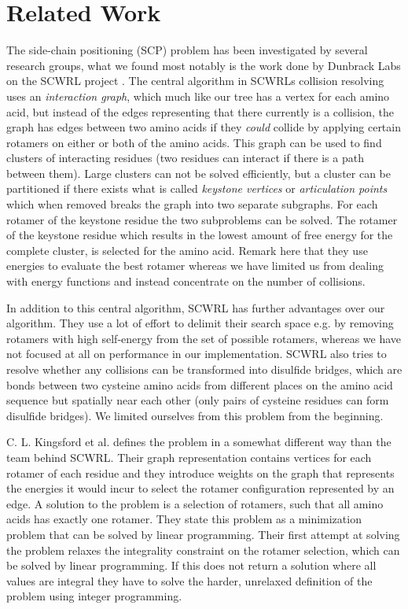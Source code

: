 
\section{Related Work}
The side-chain positioning (SCP) problem has been investigated by
several research groups, what we found most notably is the work done
by Dunbrack Labs on the SCWRL project \cite{canutescu2003graph,
  krivov2009improved}. The central algorithm in SCWRLs collision
resolving uses an \textit{interaction graph}, which much like our tree
has a vertex for each amino acid, but instead of the edges
representing that there currently is a collision, the graph has edges
between two amino acids if they \textit{could} collide by applying
certain rotamers on either or both of the amino acids. This graph can
be used to find clusters of interacting residues (two residues can
interact if there is a path between them). Large clusters can not be
solved efficiently, but a cluster can be partitioned if there exists
what is called \textit{keystone vertices} or \textit{articulation
  points} which when removed breaks the graph into two separate
subgraphs. For each rotamer of the keystone residue the two
subproblems can be solved. The rotamer of the keystone residue which
results in the lowest amount of free energy for the complete cluster,
is selected for the amino acid. Remark here that they use energies to
evaluate the best rotamer whereas we have limited us from dealing
with energy functions and instead concentrate on the number of
collisions.

In addition to this central algorithm, SCWRL has further advantages
over our algorithm. They use a lot of effort to delimit their search
space e.g. by removing rotamers with high self-energy from the set of
possible rotamers, whereas we have not focused at all on performance
in our implementation. SCWRL also tries to resolve whether any
collisions can be transformed into disulfide bridges, which are bonds
between two cysteine amino acids from different places on the amino
acid sequence but spatially near each other (only pairs of cysteine
residues can form disulfide bridges). We limited ourselves from this
problem from the beginning.

C. L. Kingsford et al. \cite{kingsford2005solving} defines the problem
in a somewhat different way than the team behind SCWRL. Their graph
representation contains vertices for each rotamer of each residue and
they introduce weights on the graph that represents the energies it
would incur to select the rotamer configuration represented by an
edge. A solution to the problem is a selection of rotamers, such that
all amino acids has exactly one rotamer. They state this problem as a minimization
problem that can be solved by linear programming. Their first attempt
at solving the problem relaxes the integrality constraint on the
rotamer selection, which can be solved by linear programming. If this
does not return a solution where all values are integral they have to
solve the harder, unrelaxed definition of the problem using integer
programming.

